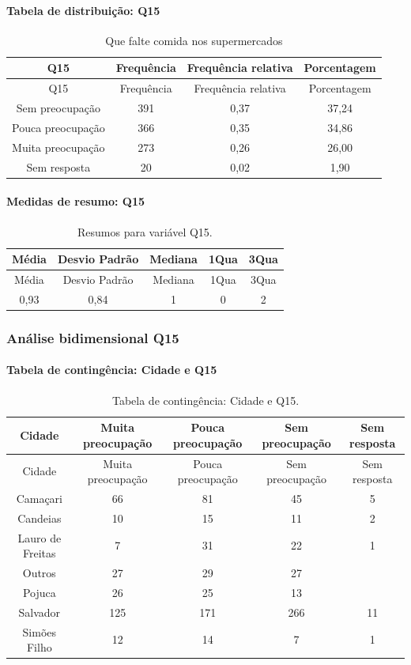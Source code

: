 \documentclass[]{article}
\let\oldparagraph\paragraph
\renewcommand{\paragraph}[1]{\oldparagraph{#1}\mbox{}}
\begin{document}
\hypertarget{tabela-de-distribuiuxe7uxe3o-q15}{%
\paragraph{Tabela de distribuição: Q15}\label{tabela-de-distribuiuxe7uxe3o-q15}}

\begin{longtable}[]{@{}cccc@{}}
\caption{\label{tab:unnamed-chunk-96}Que falte comida nos supermercados}\tabularnewline
\toprule
Q15 & Frequência & Frequência relativa & Porcentagem\tabularnewline
\midrule
\endfirsthead
\toprule
Q15 & Frequência & Frequência relativa & Porcentagem\tabularnewline
\midrule
\endhead
Sem preocupação & 391 & 0,37 & 37,24\tabularnewline
Pouca preocupação & 366 & 0,35 & 34,86\tabularnewline
Muita preocupação & 273 & 0,26 & 26,00\tabularnewline
Sem resposta & 20 & 0,02 & 1,90\tabularnewline
\bottomrule
\end{longtable}

\hypertarget{medidas-de-resumo-q15}{%
\paragraph{Medidas de resumo: Q15}\label{medidas-de-resumo-q15}}

\begin{longtable}[]{@{}ccccc@{}}
\caption{\label{tab:unnamed-chunk-97}Resumos para variável Q15.}\tabularnewline
\toprule
Média & Desvio Padrão & Mediana & 1Qua & 3Qua\tabularnewline
\midrule
\endfirsthead
\toprule
Média & Desvio Padrão & Mediana & 1Qua & 3Qua\tabularnewline
\midrule
\endhead
0,93 & 0,84 & 1 & 0 & 2\tabularnewline
\bottomrule
\end{longtable}

\cleardoublepage

\hypertarget{anuxe1lise-bidimensional-q15}{%
\subsubsection{Análise bidimensional Q15}\label{anuxe1lise-bidimensional-q15}}

\hypertarget{tabela-de-continguxeancia-cidade-e-q15}{%
\paragraph{Tabela de contingência: Cidade e Q15}\label{tabela-de-continguxeancia-cidade-e-q15}}

\begin{longtable}[]{@{}ccccc@{}}
\caption{\label{tab:unnamed-chunk-98}Tabela de contingência: Cidade e Q15.}\tabularnewline
\toprule
Cidade & Muita preocupação & Pouca preocupação & Sem preocupação & Sem resposta\tabularnewline
\midrule
\endfirsthead
\toprule
Cidade & Muita preocupação & Pouca preocupação & Sem preocupação & Sem resposta\tabularnewline
\midrule
\endhead
Camaçari & 66 & 81 & 45 & 5\tabularnewline
Candeias & 10 & 15 & 11 & 2\tabularnewline
Lauro de Freitas & 7 & 31 & 22 & 1\tabularnewline
Outros & 27 & 29 & 27 &\tabularnewline
Pojuca & 26 & 25 & 13 &\tabularnewline
Salvador & 125 & 171 & 266 & 11\tabularnewline
Simões Filho & 12 & 14 & 7 & 1\tabularnewline
\bottomrule
\end{longtable}
\end{document}
